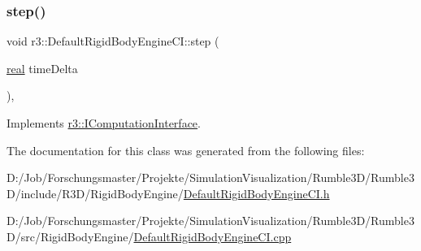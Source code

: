\subsubsection{\texorpdfstring{step()}{step()}}
{\footnotesize\ttfamily void r3\+::\+Default\+Rigid\+Body\+Engine\+C\+I\+::step (\begin{DoxyParamCaption}\item[{\mbox{\hyperlink{namespacer3_ab2016b3e3f743fb735afce242f0dc1eb}{real}}}]{time\+Delta }\end{DoxyParamCaption})\hspace{0.3cm}{\ttfamily [override]}, {\ttfamily [virtual]}}



Implements \mbox{\hyperlink{classr3_1_1_i_computation_interface_aaa12bcc35005f32a1984b38de97696cb}{r3\+::\+I\+Computation\+Interface}}.



The documentation for this class was generated from the following files\+:\begin{DoxyCompactItemize}
\item 
D\+:/\+Job/\+Forschungsmaster/\+Projekte/\+Simulation\+Visualization/\+Rumble3\+D/\+Rumble3\+D/include/\+R3\+D/\+Rigid\+Body\+Engine/\mbox{\hyperlink{_default_rigid_body_engine_c_i_8h}{Default\+Rigid\+Body\+Engine\+C\+I.\+h}}\item 
D\+:/\+Job/\+Forschungsmaster/\+Projekte/\+Simulation\+Visualization/\+Rumble3\+D/\+Rumble3\+D/src/\+Rigid\+Body\+Engine/\mbox{\hyperlink{_default_rigid_body_engine_c_i_8cpp}{Default\+Rigid\+Body\+Engine\+C\+I.\+cpp}}\end{DoxyCompactItemize}
